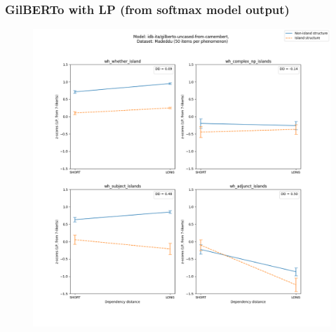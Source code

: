 \subsubsection{GilBERTo with LP (from softmax model output)}
\begin{figure}[h]
	\centering
	\includegraphics[width=1\textwidth]{images/Chapter1/Madeddu_wh_idb-ita_gilberto-uncased-from-camembert_LP-zscores-likert-2022-07-11.png} 
\end{figure}

\clearpage
